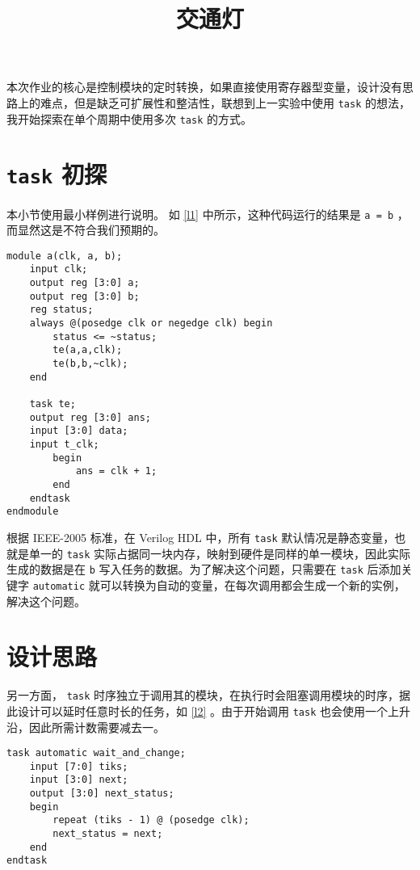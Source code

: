 \documentclass[lang=cn]{elegantpaper}
\title{交通灯}
\begin{document}
\maketitle

本次作业的核心是控制模块的定时转换，如果直接使用寄存器型变量，设计没有思路上的难点，但是缺乏可扩展性和整洁性，联想到上一实验中使用 \lstinline{task} 的想法，我开始探索在单个周期中使用多次 \lstinline{task} 的方式。

\section{ \lstinline{task} 初探}

本小节使用最小样例进行说明。  如 \ref{l1} 中所示，这种代码运行的结果是 \lstinline{a = b} ，而显然这是不符合我们预期的。

\begin{lstlisting}[caption={使用寄存器的任务},label={l1}]
module a(clk, a, b);
    input clk;
    output reg [3:0] a;
    output reg [3:0] b;
    reg status;
    always @(posedge clk or negedge clk) begin
        status <= ~status;
        te(a,a,clk);
        te(b,b,~clk);
    end

    task te;
    output reg [3:0] ans;
    input [3:0] data;
    input t_clk;
        begin
            ans = clk + 1;
        end
    endtask
endmodule
\end{lstlisting}

根据 IEEE-2005 标准，在 Verilog HDL 中，所有 \lstinline{task} 默认情况是静态变量，也就是单一的 \lstinline{task} 实际占据同一块内存，映射到硬件是同样的单一模块，因此实际生成的数据是在 \lstinline{b} 写入任务的数据。为了解决这个问题，只需要在 \lstinline{task} 后添加关键字 \lstinline{automatic} 就可以转换为自动的变量，在每次调用都会生成一个新的实例，解决这个问题。

\section{设计思路}

另一方面， \lstinline{task} 时序独立于调用其的模块，在执行时会阻塞调用模块的时序，据此设计可以延时任意时长的任务，如 \ref{l2} 。由于开始调用 \lstinline{task} 也会使用一个上升沿，因此所需计数需要减去一。

\begin{lstlisting}[caption={延时任务},label={l2}]
task automatic wait_and_change; 
    input [7:0] tiks;
    input [3:0] next;
    output [3:0] next_status;
    begin
        repeat (tiks - 1) @ (posedge clk);
        next_status = next;
    end
endtask
\end{lstlisting}
\end{document}
